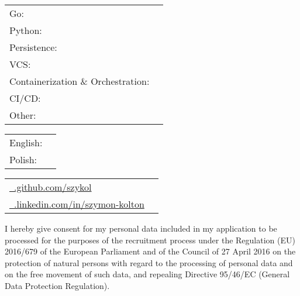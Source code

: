 \documentclass[]{awesome-cv}
\begin{document}
\vspace{-2mm}
\begin{cventries}
	\cventry
	{}
	{\def\arraystretch{1.15}{\begin{tabular}{ l l }
		Go: & {\skill{gomock, zap }} \\
		Python:  & {\skill{ asyncio, fastapi, psycopg, asyncpg, aiohttp, flask, twisted, pytest }} \\
		Persistence:  & {\skill{ postgresql, redis, mongodb }} \\
		VCS: & {\skill { git, github, gitlab, bitbucket, tfs }} \\
		Containerization \& Orchestration: & {\skill {kubernetes, helm, docker, docker-compose, k3s, harbor, k9s}} \\
		CI/CD: & {\skill {gitlab CI/CD, github actions, Jenkins}} \\
		Other: & {\skill {azure, jira, scrum, hexagonal architecture, swagger, driver license}} \\
		\end{tabular}}}
	{}
	{}
	{}
\end{cventries}

\vspace{-7mm}

\begin{cventries}
	\cventry
	{}
	{\def\arraystretch{1.25}{\begin{tabular}{ l l }
		English:  & {\skill{ B2}} \\
		Polish:  & {\skill{ Native}} \\
		\end{tabular}}}
	{}
	{}
	{}
\end{cventries}
\vspace{-7mm}

\begin{cventries}
	\cventry
	{}
	{\def\arraystretch{1.25}{\begin{tabular}{ l l }
		\href{https://www.github.com/szykol}{\faGithubSquare\ \@www.github.com/szykol} \\
		\href{https://www.linkedin.com/in/szymon-kolton}{\faLinkedinSquare\ \@www.linkedin.com/in/szymon-kolton} \\
		\end{tabular}}}
	{}
	{}
	{}
\end{cventries}



\vspace{-5mm}
\begin{cventries}
	\cventry
	{}
	{}
	{}
	{}
	{I hereby give consent for my personal data included in my application to be processed for the purposes of the recruitment process under the Regulation (EU) 2016/679 of the European Parliament and of the Council of 27 April 2016 on the protection of natural persons with regard to the processing of personal data and on the free movement of such data, and repealing Directive 95/46/EC
	(General Data Protection Regulation).}
\end{cventries}
\end{document}
